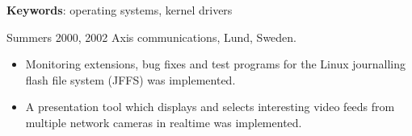 \documentclass[a4paper]{article}
\begin{document}
\begin{CV}
\textbf{Keywords}: operating systems, kernel drivers


\item[Summers 2000, 2002] Axis communications, Lund, Sweden.
  \begin{itemize}
  \item Monitoring extensions, bug fixes and test programs for the Linux journalling
    flash file system (JFFS) was implemented.
  \item A presentation tool which displays and selects interesting video feeds
    from multiple network cameras in realtime was implemented.
  \end{itemize}

\end{CV}
%




\nocite{kagstrom08phd, kagstrom05experiences, kagstrom05appkern,
  kagstrom07cibyl}
\noindent
\end{document}
